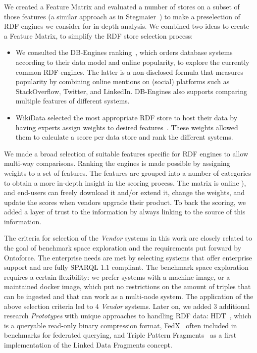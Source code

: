 
We created a Feature Matrix and evaluated a number of stores on a subset of those features (a similar approach as in Stegmaier~\cite{Stegmaier_evaluationof}) to make a preselection of RDF engines we consider for in-depth analysis.
We combined two ideas to create a Feature Matrix, to simplify the RDF store selection process:
\begin{itemize}
\item We consulted the DB-Engines ranking~\cite{dbengines}, which orders database systems according to their data model and online popularity, to explore the currently common 
RDF-engines.
The latter is a non-disclosed formula that measures popularity by combining online mentions on (social) platforms such as StackOverflow, Twitter, and LinkedIn. 
DB-Engines also supports comparing multiple features of different systems.
\item WikiData selected the most appropriate RDF store to host their data by having experts assign weights to desired features~\cite{wikidataranking}.
These weights allowed them to calculate a score per data store and rank the different systems. 
\end{itemize}
We made a broad selection of suitable features specific for RDF engines to allow multi-way comparisons. Ranking the engines is made possible by assigning weights to a set of features. 
The features are grouped into a number of categories to obtain a more in-depth insight in the scoring process. 
The matrix is online ), and end-users can freely download it and/or extend it, change the weights, and update the scores when vendors upgrade their product. 
To back the scoring, we added a layer of trust to the information by always linking to the source of this information.

The criteria for selection of the \emph{Vendor} systems in this work are closely related to the goal of benchmark space exploration and the requirements put forward by Ontoforce. 
The enterprise needs are met by selecting systems that offer enterprise support and are fully SPARQL 1.1 compliant. The benchmark space exploration requires a certain flexibility: we prefer systems with a machine image, or a maintained docker image, which put no restrictions on the amount of triples that can be ingested and that can work as a multi-node system.
The application of the above selection criteria led to 4 \emph{Vendor} systems. 
Later on, we added 3 additional research \emph{Prototypes} with unique approaches to handling RDF data: HDT~\cite{DBLP:journals/ws/FernandezMGPA13}, which is a queryable read-only binary compression format, FedX~\cite{DBLP:conf/semweb/SchwarteHHSS11} often included in benchmarks for federated querying, and Triple Pattern Fragments~\cite{DBLP:conf/semweb/VerborghHMHVSCCMW14} as a first implementation of the Linked Data Fragments concept.

